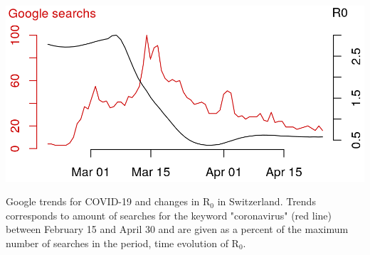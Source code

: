 \begin{marginfigure}[1\baselineskip]
\includegraphics{fig_covid-switzerland-npi/fig_supp/google_trends.png}
\caption[Google trends for COVID-19 and changes in R$_0$ in Switzerland]{\footnotesize Google trends for COVID-19 and changes in R$_0$ in Switzerland. Trends corresponds to amount of searches for the keyword "coronavirus" (red line) between February 15 and April 30 and are given as a percent of the maximum number of searches in the period, time evolution of R$_0$.}
\end{marginfigure}
